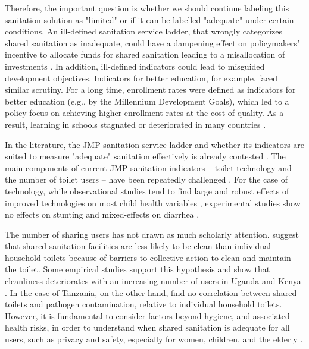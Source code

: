 \documentclass[natbib]{svjour3}                     %
\begin{document}
Therefore, the important question is whether we should continue labeling this sanitation solution as "limited" or if it can be labelled "adequate" under certain conditions. An  ill-defined  sanitation  service  ladder, that wrongly categorizes shared sanitation as inadequate, could have a dampening effect on policymakers’ incentive to allocate funds for shared sanitation leading to a misallocation of investments \citep{Evans2017}. In addition, ill-defined indicators could lead to misguided development objectives. Indicators for better education, for example, faced similar scrutiny. For a long time, enrollment rates were defined as indicators for better education (e.g., by the Millennium Development Goals), which led to a policy focus on achieving higher enrollment rates at the cost of quality. As a result, learning in schools stagnated or deteriorated in many countries \citep{WorldBank2018}.

In the literature, the JMP sanitation service ladder and whether its indicators are suited to measure "adequate" sanitation effectively is already contested \citep{Evans2017}. The main components of current JMP sanitation indicators -- toilet technology and the number of toilet users -- have been repeatedly challenged \citep{Mara2016, Evans2017}. For the case of technology, while observational studies tend to find large and robust effects of improved technologies on most child health variables \citep{Fink2011, Heijnen2014, Andres2017, Headey2019}, experimental studies show no effects on stunting and mixed-effects on diarrhea \citep{Clasen2014, Patil2015, Luby2018, Null2018, Humphrey2019}. 

The number of sharing users has not drawn as much scholarly attention. \cite{Tumwebaze2014, Tumwebaze2014a, Shiras2018} suggest that shared sanitation facilities are less likely to be clean than individual household toilets because of barriers to collective action to clean and maintain the toilet. Some empirical studies support this hypothesis and show that cleanliness deteriorates with an increasing number of users in Uganda and Kenya \citep{Gunther2012, Simiyu2017c}. In the case of Tanzania, on the other hand, \cite {Exley2015} find no correlation between shared toilets and pathogen contamination, relative to individual household toilets. However, it is fundamental to consider factors beyond hygiene, and associated health risks, in order to understand when shared sanitation is adequate for all users, such as privacy and safety, especially for women, children, and the elderly \citep{Gine-Garriga2017, Sclar2018, Kwiringira2014, Tidwell2018, Simiyu2017c, Schelbert2020}. 
\end{document}
